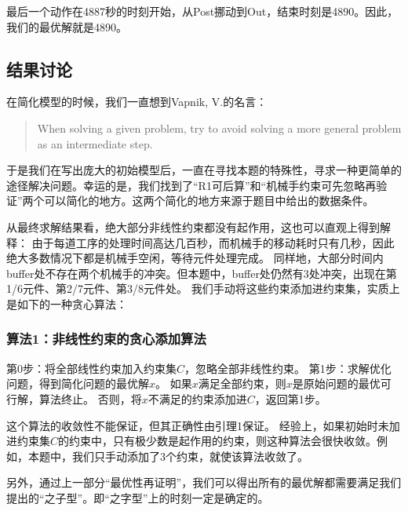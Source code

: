 \documentclass{ctexart}
\begin{document}
{{        最后一个动作在4887秒的时刻开始，从Post挪动到Out，结束时刻是4890。因此，我们的最优解就是4890。
    }

    \subsection{结果讨论}
    {
    	在简化模型的时候，我们一直想到Vapnik, V.的名言：
    	
    	\begin{quotation}
    		When solving a given problem, try to avoid solving a more general problem as an intermediate step.
    	\end{quotation}
    
    	于是我们在写出庞大的初始模型后，一直在寻找本题的特殊性，寻求一种更简单的途径解决问题。幸运的是，我们找到了“R1可后算”和“机械手约束可先忽略再验证”两个可以简化的地方。这两个简化的地方来源于题目中给出的数据条件。
    	
        从最终求解结果看，绝大部分非线性约束都没有起作用，这也可以直观上得到解释：
        由于每道工序的处理时间高达几百秒，而机械手的移动耗时只有几秒，因此绝大多数情况下都是机械手空闲，等待元件处理完成。
        同样地，大部分时间内buffer处不存在两个机械手的冲突。但本题中，buffer处仍然有3处冲突，出现在第1/6元件、第2/7元件、第3/8元件处。
        我们手动将这些约束添加进约束集，实质上是如下的一种贪心算法：

        \subsubsection*{算法1：非线性约束的贪心添加算法}
        {
            \begin{outline}
                \1 第0步：将全部线性约束加入约束集$C$，忽略全部非线性约束。
                \1 第1步：求解优化问题，得到简化问题的最优解$x$。
                    \2 如果$x$满足全部约束，则$x$是原始问题的最优可行解，算法终止。
                    \2 否则，将$x$不满足的约束添加进$C$，返回第1步。
            \end{outline}

            这个算法的收敛性不能保证，但其正确性由引理1保证。
            经验上，如果初始时未加进约束集$C$的约束中，只有极少数是起作用的约束，则这种算法会很快收敛。例如，本题中，我们只手动添加了3个约束，就使该算法收敛了。
        }
    
    	另外，通过上一部分“最优性再证明”，我们可以得出所有的最优解都需要满足我们提出的“之子型”。即“之字型”上的时刻一定是确定的。
    }
    
    \clearpage
}
\end{document}
